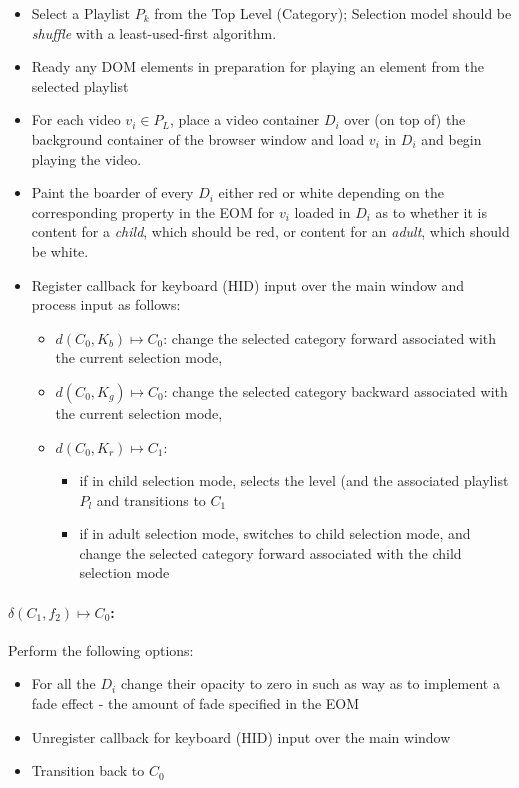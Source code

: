 \documentclass[10pt]{article}
\begin{document}
\begin{itemize}
	\item Select a Playlist $P_{k}$ from the Top Level (Category);  Selection model should be \emph{shuffle} with a least-used-first algorithm.
	\item Ready any DOM elements in preparation for playing an element from the selected playlist
	\item For each video $v_{i} \in P_{L}$, place a video container $D_{i}$ over (on top of) the background container of the browser window and load $v_{i}$ in $D_{i}$ and begin playing the video.
	\item Paint the boarder of every $D_{i}$ either red or white depending on the corresponding property in the EOM for $v_{i}$ loaded in $D_{i}$ as to whether it is content for a \emph{child\/}, which should be red, or content for an \emph{adult\/}, which should be white.
	\item Register callback for keyboard (HID) input over the main window and process input as follows:
	\begin{itemize}
		\item $d(C_{0}, K_{b}) \mapsto C_{0}$: change the selected category forward associated with the current selection mode,
		\item $d(C_{0}, K_{g}) \mapsto C_{0}$: change the selected category backward associated with the current selection mode,
		\item $d(C_{0}, K_{r}) \mapsto C_{1}$: 
		\begin{itemize}
			\item if in child selection mode, 	selects the level (and the associated playlist $P_{l}$ and transitions to $C_{1}$
			\item if in adult selection mode, switches to child selection mode, and change the selected category forward associated with the child selection mode
		\end{itemize}
	\end{itemize}
\end{itemize}

\paragraph{$\delta(C_{1}, f_{2}) \mapsto C_{0}$:} 

Perform the following options:

\begin{itemize}
	\item For all the $D_{i}$ change their opacity to zero in such as way as to implement a fade effect - the amount of fade specified in the EOM
	\item Unregister callback for keyboard (HID) input over the main window 
	\item Transition back to $C_{0}$
\end{itemize}
\end{document}

